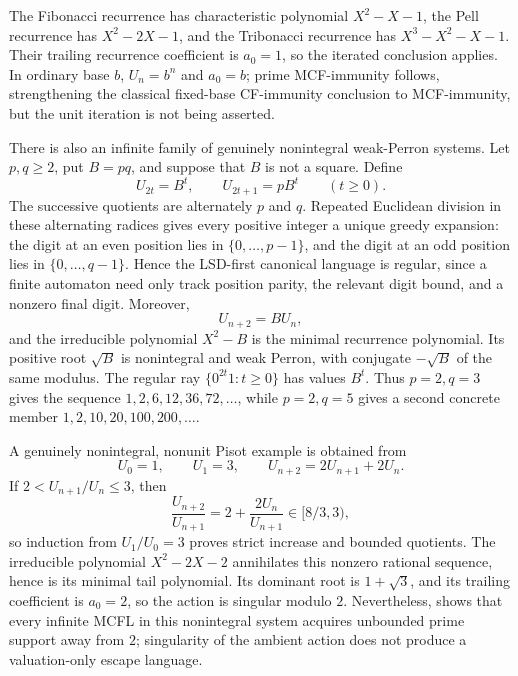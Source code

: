\begin{example}
  \label{ex:pisot-unit-nonunit}
  The Fibonacci recurrence has characteristic polynomial
  \(X^2-X-1\), the Pell recurrence has \(X^2-2X-1\), and the
  Tribonacci recurrence has \(X^3-X^2-X-1\). Their trailing recurrence
  coefficient is \(a_0=1\), so the iterated conclusion applies. In
  ordinary base \(b\), \(U_n=b^n\) and \(a_0=b\); prime MCF-immunity
  follows, strengthening the classical fixed-base CF-immunity conclusion
  to MCF-immunity, but the unit iteration is not being asserted.

  There is also an infinite family of genuinely nonintegral weak-Perron
  systems. Let \(p,q\ge2\), put \(B=pq\), and suppose that \(B\) is not a
  square. Define
  \[
    U_{2t}=B^t,\qquad U_{2t+1}=pB^t\qquad(t\ge0).
  \]
  The successive quotients are alternately \(p\) and \(q\). Repeated
  Euclidean division in these alternating radices gives every positive
  integer a unique greedy expansion: the digit at an even position lies
  in \(\{0,\ldots,p-1\}\), and the digit at an odd position lies in
  \(\{0,\ldots,q-1\}\). Hence the LSD-first canonical language is regular,
  since a finite automaton need only track position parity, the relevant
  digit bound, and a nonzero final digit. Moreover,
  \[
    U_{n+2}=BU_n,
  \]
  and the irreducible polynomial \(X^2-B\) is the minimal recurrence
  polynomial. Its positive root \(\sqrt B\) is nonintegral and weak Perron,
  with conjugate \(-\sqrt B\) of the same modulus. The regular ray
  \(\{0^{2t}1:t\ge0\}\) has values \(B^t\). Thus \(p=2,q=3\) gives the
  sequence \(1,2,6,12,36,72,\ldots\), while \(p=2,q=5\) gives a second
  concrete member \(1,2,10,20,100,200,\ldots\).

  A genuinely nonintegral, nonunit Pisot example is obtained from
  \[
    U_0=1,\qquad U_1=3,\qquad
    U_{n+2}=2U_{n+1}+2U_n.
  \]
  If \(2<U_{n+1}/U_n\le3\), then
  \[
    \frac{U_{n+2}}{U_{n+1}}
      =2+\frac{2U_n}{U_{n+1}}\in[8/3,3),
  \]
  so induction from \(U_1/U_0=3\) proves strict increase and bounded
  quotients. The irreducible polynomial \(X^2-2X-2\) annihilates this
  nonzero rational sequence, hence is its minimal tail polynomial. Its
  dominant root is \(1+\sqrt3\), and its trailing coefficient is
  \(a_0=2\), so the action is singular modulo \(2\). Nevertheless,
   shows that every
  infinite MCFL in this nonintegral system acquires unbounded prime support
  away from \(2\); singularity of the ambient action does not produce a
  valuation-only escape language.


\end{example}
